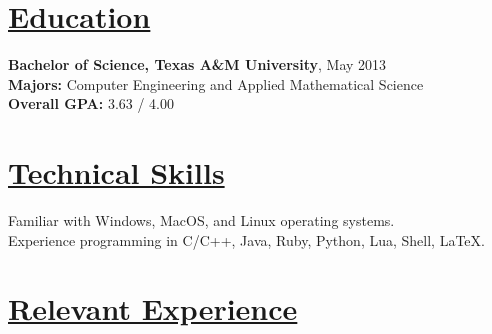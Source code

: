 \documentclass[8pt]{res}
\begin{document}
 

  \address{\bf juanlb1988@gmail.com \texttt{||} (254)-449-6995}

  \begin{resume}


    \section{\underline{Education}}          
    \textbf{Bachelor of Science, Texas A\&M University}, May 2013   \\       
    \textbf{Majors:} Computer Engineering and Applied Mathematical Science \\
    \textbf{Overall GPA:} 3.63 / 4.00     


    \section{\underline{Technical Skills}}        
    Familiar with Windows, MacOS, and Linux operating systems. \\
    Experience programming in C/C++, Java, Ruby, Python, Lua, Shell, \LaTeX.


    \section{\underline{Relevant Experience}}\vspace{-5pt}


\end{resume}
\end{document}
